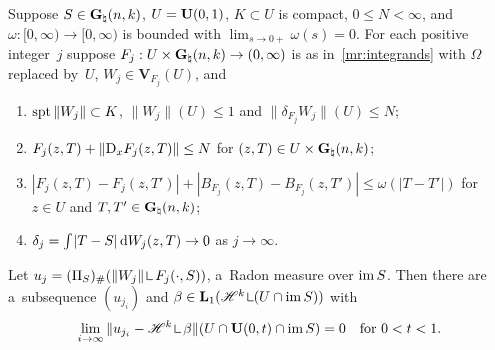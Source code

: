\documentclass[a4paper,twoside,leqno]{article}
\newcommand{\Gk}{\pgrass{\adim}{\vdim}}        %
\begin{document}
\begin{lemma}
    \label{ddg:3.2}
    Suppose $S \in \Gk$, $U = \mathbf{U}(0,1)$, $K \subset U$ is compact, $0 \le N < \infty$, and
    $\omega : [0,\infty) \to [0,\infty)$ is bounded with $\lim_{s \to 0+} \omega(s) = 0$. For each
    positive integer~$j$ suppose $F_j : U \times \Gk \to (0,\infty)$ is as in~\ref{mr:integrands}
    with $\Omega$ replaced by~$U$, $W_j \in \mathbf{V}_{F_j}(U)$, and
    \begin{enumerate}
        \item
        \label{i:ddg:3.2:1}
        $\operatorname{spt} \|W_j\| \subset K$, $\|W_j\|(U) \le 1$ and $\|\delta_{F_j} W_j\|(U) \le N$;
        \item
        \label{i:ddg:3.2:2}
        $F_j(z,T) + \|\mathrm{D}_x F_j(z,T)\| \le N$ for $(z,T) \in U \times \Gk$;
        \item
        \label{i:ddg:3.2:3}
        $|F_j(z,T) - F_j(z,T')| + |B_{F_j}(z,T) - B_{F_j}(z,T')| \le \omega(|T - T'|)$ for $z \in
        U$ and $T, T' \in \Gk$;
        \item
        \label{i:ddg:3.2:4}
        $\delta_j = {\textstyle\int_{}^{}} |T - S| \,\mathrm{d} W_j(z,T) \to 0$ as $j \to \infty$.
    \end{enumerate}
    Let $u_j = (\Pi_S)_\# (\|W_j\| \restrict F_j(\cdot,S))$, a~Radon measure over $\operatorname{im} S$. Then
    there are a~subsequence $(u_{j_i})$ and $\beta \in \Lp{1}(\HM^{\vdim} \restrict (U \cap \im
    S))$ with
    \begin{displaymath}
        \lim_{i \to \infty} \|u_{j_i} - \HM^{\vdim} \restrict \beta\|(U \cap \oball{0}{t} \cap \im S) =
        0 \quad \text{for $0 < t < 1$}.
    \end{displaymath}
\end{lemma}
\end{document}
